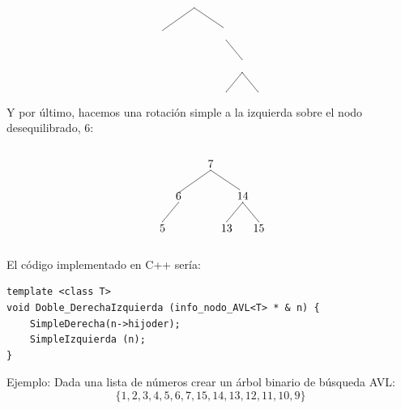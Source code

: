 \documentclass[10pt,a4paper,spanish]{report}
\begin{document}
\begin{description}
\[\begin{xy}
	\ar@{-} (0,-2);(-10,-9) %
	\ar@{-} (0,-2);(9,-8) %
	\ar@{-} (10,-12);(15,-18) %
	\ar@{-} (15,-22);(10,-28) %
	\ar@{-} (15,-22);(20,-28)
	\end{xy}\]

	\noindent
	Y por último, hacemos una rotación simple a la izquierda sobre el nodo desequilibrado, 6:

	\[\begin{xy}
	,(0,0)*+=<10mm>[]\txt<2cm>{7}
	,(-10,-10)*+=<10mm>[]\txt<2cm>{6}
	,(10,-10)*+=<10mm>[]\txt<2cm>{14}
	,(-15,-20)*+=<10mm>[]\txt<2cm>{5}
	,(5,-20)*+=<10mm>[]\txt<2cm>{13}
	,(15,-20)*+=<10mm>[]\txt<2cm>{15}

	\ar@{-} (0,-2);(-10,-9) %
	\ar@{-} (0,-2);(9,-8) %
	\ar@{-} (-10,-12);(-15,-18) %
	\ar@{-} (10,-12);(5,-18) %
	\ar@{-} (10,-12);(15,-18) %
	\end{xy}\]

	\noindent
	El código implementado en C++ sería:
\begin{verbatim}
template <class T>
void Doble_DerechaIzquierda (info_nodo_AVL<T> * & n) {
	SimpleDerecha(n->hijoder);
	SimpleIzquierda (n);
}
\end{verbatim}
\end{description}

\noindent
Ejemplo: Dada una lista de números crear un árbol binario de búsqueda AVL:
\begin{displaymath}
\{1,2,3,4,5,6,7,15,14,13,12,11,10,9\}
\end{displaymath}
\end{document}
